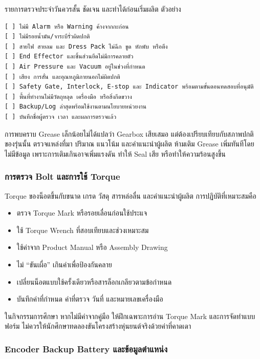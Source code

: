 รายการตรวจประจำวันควรสั้น ชัดเจน และทำได้ก่อนเริ่มผลิต ตัวอย่าง

\begin{verbatim}
[ ] ไม่มี Alarm หรือ Warning ค้างจากกะก่อน
[ ] ไม่มีรอยน้ำมัน/จาระบีรั่วผิดปกติ
[ ] สายไฟ สายลม และ Dress Pack ไม่ฉีก ขูด หักพับ หรือตึง
[ ] End Effector และชิ้นส่วนยึดไม่มีการคลายตัว
[ ] Air Pressure และ Vacuum อยู่ในช่วงที่กำหนด
[ ] เสียง การสั่น และอุณหภูมิภายนอกไม่ผิดปกติ
[ ] Safety Gate, Interlock, E-stop และ Indicator พร้อมตามขั้นตอนทดสอบที่อนุมัติ
[ ] พื้นที่ทำงานไม่มีวัตถุหลุด เครื่องมือ หรือสิ่งกีดขวาง
[ ] Backup/Log ล่าสุดพร้อมใช้งานตามนโยบายหน่วยงาน
[ ] บันทึกชื่อผู้ตรวจ เวลา และผลการตรวจแล้ว
\end{verbatim}

การพบคราบ Grease เล็กน้อยไม่ได้แปลว่า Gearbox เสียเสมอ แต่ต้องเปรียบเทียบกับสภาพปกติของรุ่นนั้น ตรวจแหล่งที่มา ปริมาณ แนวโน้ม และคำแนะนำผู้ผลิต ห้ามเติม Grease เพิ่มทันทีโดยไม่มีข้อมูล เพราะการเติมเกินอาจเพิ่มแรงดัน ทำให้ Seal เสีย หรือทำให้ความร้อนสูงขึ้น

\subsubsection{การตรวจ Bolt และการใช้ Torque}

Torque ของน็อตขึ้นกับขนาด เกรด วัสดุ สารหล่อลื่น และคำแนะนำผู้ผลิต การปฏิบัติที่เหมาะสมคือ

\begin{itemize}
    \item ตรวจ Torque Mark หรือรอยเลื่อนก่อนใช้ประแจ
    \item ใช้ Torque Wrench ที่สอบเทียบและช่วงเหมาะสม
    \item ใช้ค่าจาก Product Manual หรือ Assembly Drawing
    \item ไม่ “ขันเผื่อ” เกินค่าเพื่อป้องกันคลาย
    \item เปลี่ยนน็อตแบบใช้ครั้งเดียวหรือสารล็อกเกลียวตามข้อกำหนด
    \item บันทึกค่าที่กำหนด ค่าที่ตรวจ วันที่ และหมายเลขเครื่องมือ
\end{itemize}

ในกิจกรรมการศึกษา หากไม่มีค่าจากคู่มือ ให้ฝึกเฉพาะการอ่าน Torque Mark และการจัดทำแบบฟอร์ม ไม่ควรให้นักศึกษาทดลองขันโครงสร้างหุ่นยนต์จริงด้วยค่าที่คาดเดา

\subsubsection{Encoder Backup Battery และข้อมูลตำแหน่ง}


